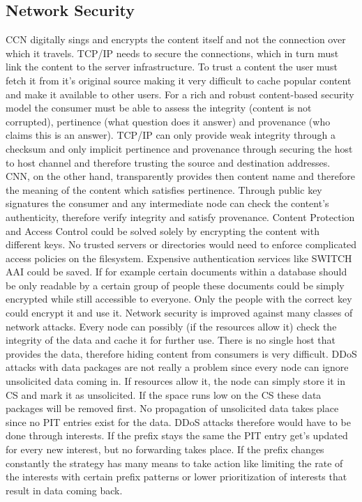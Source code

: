 \subsection{Network Security}

CCN digitally sings and encrypts the content itself and not the connection over which it travels. TCP/IP needs to secure the connections, which in turn must link the content to the server infrastructure. To trust a content the user must fetch it from it's original source making it very difficult to cache popular content and make it available to other users. For a rich and robust content-based security model the consumer must be able to assess the integrity (content is not corrupted), pertinence (what question does it answer) and provenance (who claims this is an answer). TCP/IP can only provide weak integrity through a checksum and only implicit pertinence and provenance through securing the host to host channel and therefore trusting the source and destination addresses. CNN, on the other hand, transparently provides then content name and therefore the meaning of the content which satisfies pertinence. Through public key signatures the consumer and any intermediate node can check the content's authenticity, therefore verify integrity and satisfy provenance.
Content Protection and Access Control could be solved solely by encrypting the content with different keys. No trusted servers or directories would need to enforce complicated access policies on the filesystem. Expensive authentication services like SWITCH AAI could be saved. If for example certain documents within a database should be only readable by a certain group of people these documents could be simply encrypted while still accessible to everyone. Only the people with the correct key could encrypt it and use it.
Network security is improved against many classes of network attacks. Every node can possibly (if the resources allow it) check the integrity of the data and cache it for further use. There is no single host that provides the data, therefore hiding content from consumers is very difficult.
DDoS attacks with data packages are not really a problem since every node can ignore unsolicited data coming in. If resources allow it, the node can simply store it in CS and mark it as unsolicited. If the space runs low on the CS these data packages will be removed first. No propagation of unsolicited data takes place since no PIT entries exist for the data. DDoS attacks therefore would have to be done through interests. If the prefix stays the same the PIT entry get's updated for every new interest, but no forwarding takes place. If the prefix changes constantly the strategy has many means to take action like limiting the rate of the interests with certain prefix patterns or lower prioritization of interests that result in data coming back. 

